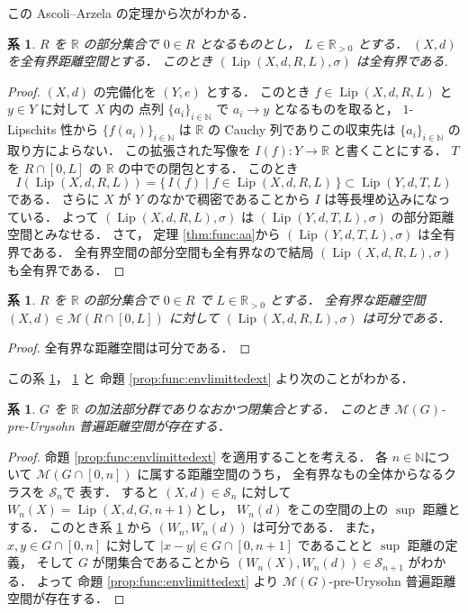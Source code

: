 \documentclass[leqno, 12pt]{jsarticle}
\newtheorem{cor}[thm]{系}
\newcommand{\nn}{\mathbb{N}}
\newcommand{\rr}{\mathbb{R}}
\DeclareMathOperator{\lip}{Lip}
\begin{document}
この
Ascoli--Arzela
の定理から次がわかる．
\begin{cor}\label{cor:func:totbd}
$R$
を
$\rr$
の部分集合で
$0\in R$
となるものとし，
$L\in \rr_{>0}$
とする．
$(X, d)$
を全有界距離空間とする．
このとき
$(\lip(X, d, R, L), \sigma)$
は全有界である.
\end{cor}
\begin{proof}
$(X, d)$
の完備化を
$(Y, e)$
とする．
このとき
$f\in \lip(X, d, R, L)$
と
$y\in Y$
に対して
$X$
内の
点列
$\{a_{i}\}_{i\in \nn}$
で
$a_{i}\to y$
となるものを取ると，
$1$-Lipschits
性から
$\{f(a_{i})\}_{i\in \nn}$
は
$\rr$
の
Cauchy
列でありこの収束先は
$\{a_{i}\}_{i\in\nn}$
の取り方によらない．
この拡張された写像を
$I(f)\colon  Y\to \rr$
と書くことにする．
$T$
を
$R\cap [0, L]$
の
$\rr$
の中での閉包とする．
このとき
\[
I(\lip(X, d, R, L))
=\{\, I(f)\mid f\in \lip(X, d, R, L)\,\}
\subset \lip(Y, d, T, L)
\]
である．
さらに
$X$
が
$Y$
のなかで稠密であることから
$I$
は等長埋め込みになっている．
よって
$(\lip(X, d, R, L), \sigma)$
は
$(\lip(Y, d, T, L), \sigma)$
の部分距離空間とみなせる．
さて，
定理 
\ref{thm:func:aa}から
$(\lip(Y, d, T, L), \sigma)$
は全有界である．
全有界空間の部分空間も全有界なので結局
$(\lip(X, d, R, L), \sigma)$
も全有界である．
\end{proof}




\begin{cor}\label{cor:func:sep}
$R$
を
$\rr$
の部分集合で
$0\in R$
で
$L\in \rr_{>0}$
とする．
全有界な距離空間
$(X, d)\in \mathscr{M}(R\cap[0, L])$
に対して
$(\lip(X, d, R, L), \sigma)$
は可分である．
\end{cor}
\begin{proof}
全有界な距離空間は可分である．
\end{proof}


この系
 \ref{cor:func:totbd}，
  \ref{cor:func:sep}
  と
命題 
\ref{prop:func:envlimittedext}
より次のことがわかる．
\begin{cor}
$G$
を
$\rr$
の加法部分群でありなおかつ閉集合とする．
このとき
$\mathscr{M}(G)$-pre-Urysohn
普遍距離空間が存在する．
\end{cor}
\begin{proof}
命題 
\ref{prop:func:envlimittedext}
を適用することを考える．
各
$n\in \nn$について
$\mathscr{M}(G\cap [0, n])$
に属する距離空間のうち，
全有界なもの全体からなるクラスを
$\mathscr{S}_{n}$で
表す．
すると
$(X, d)\in \mathscr{S}_{n}$
に対して
$W_{n}(X)=\lip(X, d, G, n+1)$とし，
$W_{n}(d)$
をこの空間の上の
$\sup$
距離とする．
このとき系 
\ref{cor:func:sep}
から
$(W_{n}, W_{n}(d))$
は可分である．
また，
$x, y\in G\cap [0, n]$
に対して
$|x-y|\in G\cap [0, n+1]$
であることと
$\sup$
距離の定義，
そして
$G$
が閉集合であることから
$(W_{n}(X), W_{n}(d))\in \mathscr{S}_{n+1}$
がわかる．
よって
命題 
\ref{prop:func:envlimittedext}
より
$\mathscr{M}(G)$-pre-Urysohn
普遍距離空間が存在する．
\end{proof} 
\end{document}
